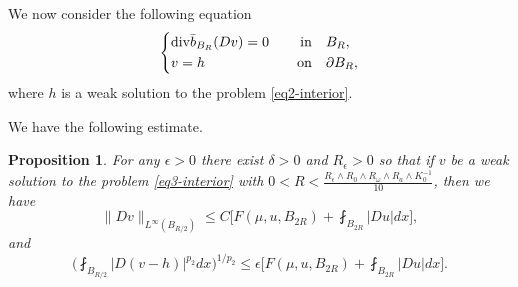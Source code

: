 \documentclass[a4paper,10pt]{amsart}
\newtheorem{prop}[thm]{Proposition}
\newcommand{\f}{\frac}
\newcommand{\om}{\omega}
\newcommand{\vc}{\infty}
\newcommand{\di}{{\rm div}}
\begin{document}
We now consider the following equation
\begin{equation}\label{eq3-interior}
	\left\{
	\begin{aligned}
		&\di \bar{b}_{B_R}(Dv)=0 \quad &\text{in}& \quad B_{R},\\
		&v=h  \quad &\text{on}& \quad \partial B_{R},
	\end{aligned}
	\right.
\end{equation}
where $h$ is a weak solution to the problem \eqref{eq2-interior}.

We have the following estimate.
\begin{prop}
	\label{prop3-interior}
	For any $\epsilon > 0$ there exist $\delta>0$ and $R_\epsilon>0$ so that if $v$ be a weak solution to the problem \eqref{eq3-interior} with $0<R<\f{R_\epsilon\wedge R_0\wedge R_\om\wedge R_a \wedge K_0^{-1}}{10}$, then we have
	\begin{equation}\label{eq1-prop3-inter}
	\|Dv\|_{L^\vc(B_{R/2})}\leq C\Big[F(\mu,u,B_{2R})+\fint_{B_{2R}}|Du|dx\Big],
	\end{equation}
	and
	\begin{equation}\label{eq2-prop3-inter}
	\Big(\fint_{B_{R/2}}|D(v-h)|^{p_2}dx\Big)^{1/p_2}\leq \epsilon\Big[F(\mu,u,B_{2R})+\fint_{B_{2R}}|Du|dx\Big].
	\end{equation}
\end{prop}
\end{document}

